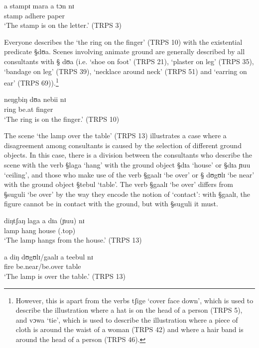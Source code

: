  \begin{exe}
 \ex\label{ex:TRPS-3}

 \gll  a stampɪ mara a tɔn nɪ\\
{\art} stamp adhere  {\art} paper {\postp} \\
 \glt `The stamp is on the letter.' (TRPS 3)

 \end{exe}


Everyone describes  the  `the ring on
the finger' (TRPS 10) with the existential predicate  {\S dʊa}. Scenes
involving animate ground are generally described by all consultants with {\S
dʊa}
(i.e. `shoe on foot' (TRPS 21), `plaster on leg' (TRPS 35),  `bandage on leg'
(TRPS 39),  `necklace around neck' (TRPS 51) and  `earring on ear' (TRPS
69)).\footnote{However, this is apart from the
verbs {\F
tʃige} `cover face down', which is used to describe the illustration where
a hat is on the head of a person (TRPS 5), and {\F vɔwa} `tie', which is used
to describe the illustration where a piece of cloth is around the waist of a
woman (TRPS 42)  and where a hair band is around the head of a person  (TRPS
46).}


 \begin{exe}
 \ex\label{ex:TRPS-10}
 \gll neŋgbiŋ dʊa nebii nɪ \\
ring be.at finger {\postp} \\
 \glt `The ring is  on the finger.' (TRPS 10)
 \end{exe}




The scene `the lamp over the table'  (TRPS  13)  illustrates a case where a
disagreement among consultants is  caused by the selection of different ground
objects. In this case, there is a division
between the consultants  who describe the scene with the verb
 {\S laga} `hang' with the ground object {\S dɪa} `house' or {\S dɪa ɲuu}
`ceiling', and those who make use of the verb {\S gaalɪ} `be over'  or {\S
 dʊgʊlɪ} `be
near' with the ground object {\S tebul} `table'. The verb {\S gaalɪ} `be
over' differs from {\S suguli} `be over' by the way they encode the notion of
`contact': with {\S gaalɪ},  the figure cannot be in contact with the ground,
 but with   {\S suguli} it must. 



 \begin{exe}
 \ex\label{ex:TRPS-13ab}
 \begin{xlist}

 \ex\label{ex:TRPS-13a}
 \gll  diŋtʃaŋ laga a dɪa (ɲuu) nɪ\\
lamp hang {\art} house {(\reln .top)} {\postp}  \\
 \glt `The lamp hangs from the house.' (TRPS 13)

 \ex\label{ex:TRPS-13b}
 \gll a diŋ dʊgʊlɪ/gaalɪ a teebul nɪ   \\
{\art} fire be.near/be.over  {\art} table  {\postp} \\
 \glt `The lamp is over the table.' (TRPS 13)
 \end{xlist}

 \end{exe}

